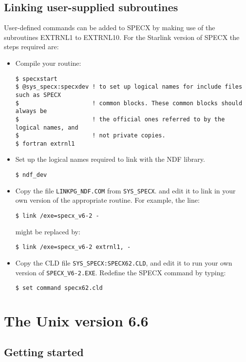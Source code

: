 \subsection{Linking user-supplied subroutines}

User-defined commands can be added to SPECX by making use of the
subroutines EXTRNL1 to EXTRNL10. For the Starlink version of SPECX 
the steps required are:

\begin{itemize}
\item
Compile your routine:
\begin{small}
\begin{verbatim}
$ specxstart
$ @sys_specx:specxdev ! to set up logical names for include files such as SPECX
$                     ! common blocks. These common blocks should always be
$                     ! the official ones referred to by the logical names, and
$                     ! not private copies.
$ fortran extrnl1

\end{verbatim}
\end{small}
\item
Set up the logical names required to link with the NDF library.
\begin{verbatim}
$ ndf_dev
\end{verbatim}

\item
Copy the file {\tt LINKPG\_NDF.COM} from {\tt SYS\_SPECX}. 
and edit it to link
in your own version of the appropriate routine. For example, the
line:
\begin{verbatim}
$ link /exe=specx_v6-2 -
\end{verbatim}
might be replaced by:
\begin{verbatim}
$ link /exe=specx_v6-2 extrnl1, -
\end{verbatim}
\item
Copy the CLD file {\tt SYS\_SPECX:SPECX62.CLD}, and 
edit it to run your own version of {\tt SPECX\_V6-2.EXE}. 
Redefine the SPECX command by typing:
\begin{verbatim}
$ set command specx62.cld
\end{verbatim}
\end{itemize}


\section {The Unix version 6.6}
\subsection {Getting started}

